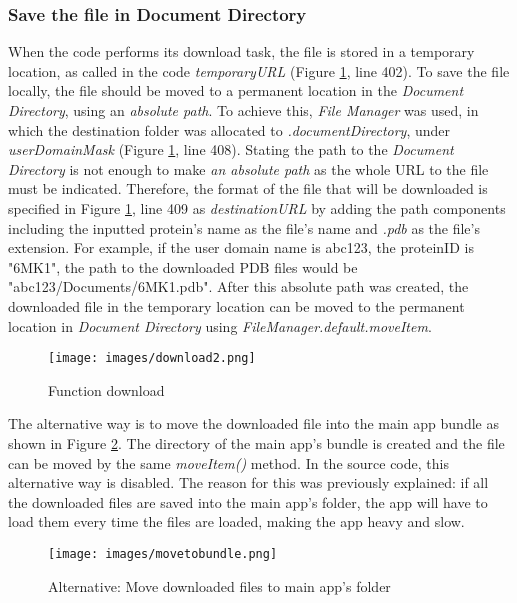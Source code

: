 \subsubsection{Save the file in Document Directory}
When the code performs its download task, the file is stored in a temporary location, as called in the code \emph{temporaryURL} (Figure \ref{fig:download2}, line 402). To save the file locally, the file should be moved to a permanent location in the \emph{Document Directory}, using an \emph{absolute path}. To achieve this, \emph{File Manager} was used, in which the destination folder was allocated to \emph{.documentDirectory}, under \emph{userDomainMask} (Figure \ref{fig:download2}, line 408). Stating the path to the \emph{Document Directory} is not enough to make \emph{an absolute path} as the whole URL to the file must be indicated. Therefore, the format of the file that will be downloaded is specified in Figure \ref{fig:download2}, line 409 as \emph{destinationURL} by adding the path components including the inputted protein's name as the file's name and \emph{.pdb} as the file's extension. For example, if the user domain name is abc123, the proteinID is "6MK1", the path to the downloaded PDB files would be "abc123/Documents/6MK1.pdb". After this absolute path was created, the downloaded file in the temporary location can be moved to the permanent location in \emph{Document Directory} using \emph{FileManager.default.moveItem}. 

 \begin{figure}[!htp]
	\centering
	\texttt{[image: images/download2.png]}
	\caption{Function download}
	\label{fig:download2}
\end{figure}


The alternative way is to move the downloaded file into the main app bundle as shown in Figure \ref{fig:movetobundle}. The directory of the main app's bundle is created and the file can be moved by the same \emph{moveItem()} method. In the source code, this alternative way is disabled. The reason for this was previously explained: if all the downloaded files are saved into the main app's folder, the app will have to load them every time the files are loaded, making the app heavy and slow. 
 \begin{figure}[!htp]
	\centering
	\texttt{[image: images/movetobundle.png]}
	\caption{Alternative: Move downloaded files to main app's folder}
	\label{fig:movetobundle}
\end{figure}


